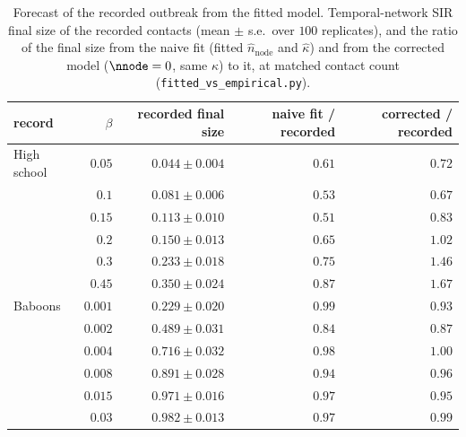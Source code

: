 \begin{table}[h]
  \centering
  \small
  \begin{tabular}{l r r r r}
    \toprule
    record & $\beta$ & recorded final size & naive fit / recorded & corrected / recorded \\
    \midrule
    High school & $0.05$ & $0.044\pm0.004$ & $0.61$ & $0.72$ \\
     & $0.1$ & $0.081\pm0.006$ & $0.53$ & $0.67$ \\
     & $0.15$ & $0.113\pm0.010$ & $0.51$ & $0.83$ \\
     & $0.2$ & $0.150\pm0.013$ & $0.65$ & $1.02$ \\
     & $0.3$ & $0.233\pm0.018$ & $0.75$ & $1.46$ \\
     & $0.45$ & $0.350\pm0.024$ & $0.87$ & $1.67$ \\
    \midrule
    Baboons & $0.001$ & $0.229\pm0.020$ & $0.99$ & $0.93$ \\
     & $0.002$ & $0.489\pm0.031$ & $0.84$ & $0.87$ \\
     & $0.004$ & $0.716\pm0.032$ & $0.98$ & $1.00$ \\
     & $0.008$ & $0.891\pm0.028$ & $0.94$ & $0.96$ \\
     & $0.015$ & $0.971\pm0.016$ & $0.97$ & $0.95$ \\
     & $0.03$ & $0.982\pm0.013$ & $0.97$ & $0.99$ \\
    \bottomrule
  \end{tabular}
  \caption{Forecast of the recorded outbreak from the fitted model. Temporal-network SIR final size of the recorded contacts (mean $\pm$ s.e.\ over $100$ replicates), and the ratio of the final size from the naive fit (fitted $\hat{n}_{\mathrm{node}}$ and $\hat\kappa$) and from the corrected model ($\nnode=0$, same $\hat\kappa$) to it, at matched contact count (\texttt{fitted\_vs\_empirical.py}).}
  \label{tab:forecast}
\end{table}
